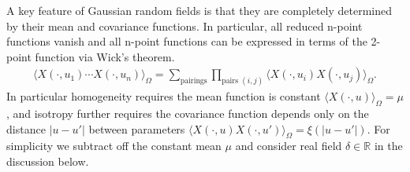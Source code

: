 A key feature of Gaussian random fields is that they are completely determined by their mean and covariance functions.
In particular, all reduced n-point functions vanish and all n-point functions can be expressed in terms of the 2-point function via Wick's theorem.
\begin{align}
    \langle X(\cdot,u_1)\cdots X(\cdot,u_n)\rangle_\Omega = \sum_{\text{pairings}} \prod_{\text{pairs }(i,j)} \langle X(\cdot,u_i)X(\cdot,u_j)\rangle_\Omega.
\end{align}
In particular homogeneity requires the mean function is constant $\langle X(\cdot,u)\rangle_\Omega = \mu$, and isotropy further requires the covariance function depends only on the distance $|u-u'|$ between parameters $\langle X(\cdot,u)X(\cdot,u')\rangle_\Omega = \xi(|u-u'|)$.
For simplicity we subtract off the constant mean $\mu$ and consider real field $\delta\in\mathbb{R}$ in the discussion below.

